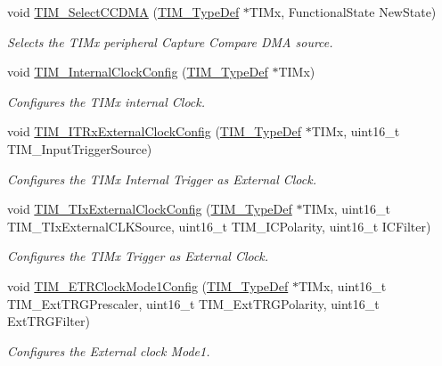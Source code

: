 \begin{DoxyCompactItemize}
void \hyperlink{group___t_i_m_ga5273cb65acb885fe7982827b1c6b7d75}{T\+I\+M\+\_\+\+Select\+C\+C\+D\+MA} (\hyperlink{struct_t_i_m___type_def}{T\+I\+M\+\_\+\+Type\+Def} $\ast$T\+I\+Mx, Functional\+State New\+State)
\begin{DoxyCompactList}\small\item\em Selects the T\+I\+Mx peripheral Capture Compare D\+MA source. \end{DoxyCompactList}\item 
void \hyperlink{group___t_i_m_ga2394f0221709c0659874f9a4184cf86e}{T\+I\+M\+\_\+\+Internal\+Clock\+Config} (\hyperlink{struct_t_i_m___type_def}{T\+I\+M\+\_\+\+Type\+Def} $\ast$T\+I\+Mx)
\begin{DoxyCompactList}\small\item\em Configures the T\+I\+Mx internal Clock. \end{DoxyCompactList}\item 
void \hyperlink{group___t_i_m_gabef227d21d9e121e6a4ec5ab6223f5a9}{T\+I\+M\+\_\+\+I\+T\+Rx\+External\+Clock\+Config} (\hyperlink{struct_t_i_m___type_def}{T\+I\+M\+\_\+\+Type\+Def} $\ast$T\+I\+Mx, uint16\+\_\+t T\+I\+M\+\_\+\+Input\+Trigger\+Source)
\begin{DoxyCompactList}\small\item\em Configures the T\+I\+Mx Internal Trigger as External Clock. \end{DoxyCompactList}\item 
void \hyperlink{group___t_i_m_gaf460e7d9c9969044e364130e209937fc}{T\+I\+M\+\_\+\+T\+Ix\+External\+Clock\+Config} (\hyperlink{struct_t_i_m___type_def}{T\+I\+M\+\_\+\+Type\+Def} $\ast$T\+I\+Mx, uint16\+\_\+t T\+I\+M\+\_\+\+T\+Ix\+External\+C\+L\+K\+Source, uint16\+\_\+t T\+I\+M\+\_\+\+I\+C\+Polarity, uint16\+\_\+t I\+C\+Filter)
\begin{DoxyCompactList}\small\item\em Configures the T\+I\+Mx Trigger as External Clock. \end{DoxyCompactList}\item 
void \hyperlink{group___t_i_m_ga47c05638b93aabcd641dbc8859e1b2df}{T\+I\+M\+\_\+\+E\+T\+R\+Clock\+Mode1\+Config} (\hyperlink{struct_t_i_m___type_def}{T\+I\+M\+\_\+\+Type\+Def} $\ast$T\+I\+Mx, uint16\+\_\+t T\+I\+M\+\_\+\+Ext\+T\+R\+G\+Prescaler, uint16\+\_\+t T\+I\+M\+\_\+\+Ext\+T\+R\+G\+Polarity, uint16\+\_\+t Ext\+T\+R\+G\+Filter)
\begin{DoxyCompactList}\small\item\em Configures the External clock Mode1. \end{DoxyCompactList}\item 

\end{DoxyCompactItemize}
